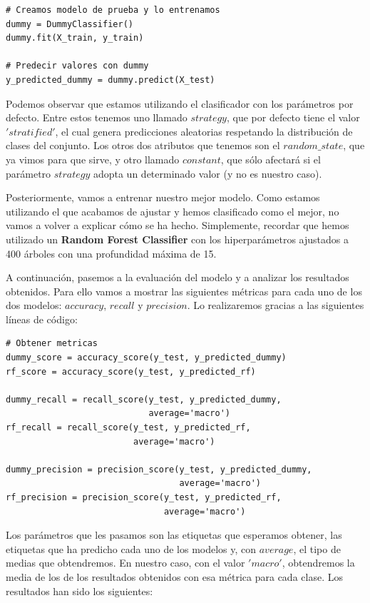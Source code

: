 \documentclass[11pt,a4paper]{article}
\begin{document}
\begin{lstlisting}
# Creamos modelo de prueba y lo entrenamos
dummy = DummyClassifier()
dummy.fit(X_train, y_train)

# Predecir valores con dummy
y_predicted_dummy = dummy.predict(X_test)
\end{lstlisting}

Podemos observar que estamos utilizando el clasificador con los parámetros por defecto. Entre estos tenemos uno llamado $strategy$, que por defecto
tiene el valor $'stratified'$, el cual genera predicciones aleatorias respetando la distribución de clases del conjunto. Los otros dos atributos que
tenemos son el $random\_state$, que ya vimos para que sirve, y otro llamado $constant$, que sólo afectará si el parámetro $strategy$ adopta un
determinado valor (y no es nuestro caso).

Posteriormente, vamos a entrenar nuestro mejor modelo. Como estamos utilizando el que acabamos de ajustar y hemos clasificado como el mejor, no vamos a
volver a explicar cómo se ha hecho. Simplemente, recordar que hemos utilizado un \textbf{Random Forest Classifier} con los hiperparámetros ajustados a 400 árboles con una
profundidad máxima de 15.

A continuación, pasemos a la evaluación del modelo y a analizar los resultados obtenidos. Para ello vamos a mostrar las siguientes métricas para cada
uno de los dos modelos: $accuracy$, $recall$ y $precision$. Lo realizaremos gracias a las siguientes líneas de código:

\begin{lstlisting}
# Obtener metricas
dummy_score = accuracy_score(y_test, y_predicted_dummy)
rf_score = accuracy_score(y_test, y_predicted_rf)

dummy_recall = recall_score(y_test, y_predicted_dummy,
                            average='macro')
rf_recall = recall_score(y_test, y_predicted_rf,
                         average='macro')

dummy_precision = precision_score(y_test, y_predicted_dummy,
                                  average='macro')
rf_precision = precision_score(y_test, y_predicted_rf,
                               average='macro')
\end{lstlisting}

Los parámetros que les pasamos son las etiquetas que esperamos obtener, las etiquetas que ha predicho cada uno de los modelos y, con
$average$, el tipo de medias que obtendremos. En nuestro caso, con el valor $'macro'$, obtendremos la media de los de los resultados obtenidos
con esa métrica para cada clase. Los resultados han sido los siguientes:
\end{document}
